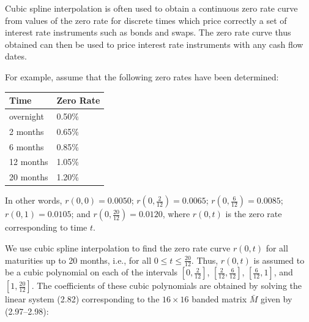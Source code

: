Cubic spline interpolation is often used to obtain a continuous zero rate curve
from values of the zero rate for discrete times which price correctly a set of
interest rate instruments such as bonds and swaps. The zero rate curve thus
obtained can then be used to price interest rate instruments with any cash flow
dates.

For example, assume that the following zero rates have been determined:

\begin{center}
\begin{tabular}{|l|l|}
\hline
Time & Zero Rate \\
\hline
overnight & 0.50\% \\
\hline
2 months & 0.65\% \\
\hline
6 months & 0.85\% \\
\hline
12 months & 1.05\% \\
\hline
20 months & 1.20\% \\
\hline
\end{tabular}
\end{center}

In other words, $r(0,0) = 0.0050$; $r\left(0,\frac2{12}\right) = 0.0065$;
$r\left(0,\frac6{12}\right) = 0.0085$; $r(0,1) = 0.0105$; and
$r\left(0,\frac{20}{12}\right) = 0.0120$, where $r(0,t)$ is the zero rate
corresponding to time $t$.

We use cubic spline interpolation to find the zero rate curve $r(0,t)$ for all
maturities up to 20 months, i.e., for all $0\le t\le\frac{20}{12}$. Thus, $r(0,t)$
is assumed to be a cubic polynomial on each of the intervals
$\left[0,\frac2{12}\right]$, $\left[\frac2{12},\frac6{12}\right]$,
$\left[\frac6{12},1\right]$, and $\left[1,\frac{20}{12}\right]$. The coefficients
of these cubic polynomials are obtained by solving the linear system (2.82)
corresponding to the $16\times16$ banded matrix $\bar M$ given by (2.97--2.98):

